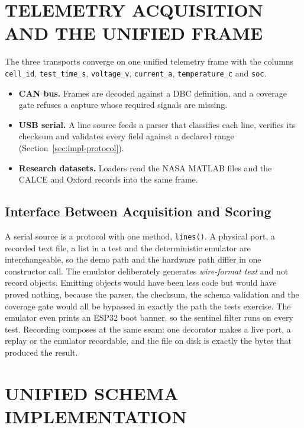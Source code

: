 \documentclass[12pt,a4paper]{amritareport}
\begin{document}
\section{TELEMETRY ACQUISITION AND THE UNIFIED FRAME}
\label{sec:impl-transports}

The three transports converge on one unified telemetry frame with the columns \texttt{cell\_id}, \texttt{test\_time\_s}, \texttt{voltage\_v}, \texttt{current\_a}, \texttt{temperature\_c} and \texttt{soc}.

\begin{itemize}
    \item \textbf{CAN bus.} Frames are decoded against a DBC definition, and a coverage gate refuses a capture whose required signals are missing.
    \item \textbf{USB serial.} A line source feeds a parser that classifies each line, verifies its checksum and validates every field against a declared range (Section~\ref{sec:impl-protocol}).
    \item \textbf{Research datasets.} Loaders read the NASA MATLAB files and the CALCE and Oxford records into the same frame.
\end{itemize}

\subsection{Interface Between Acquisition and Scoring}

A serial source is a protocol with one method, \texttt{lines()}. A physical port, a recorded text file, a list in a test and the deterministic emulator are interchangeable, so the demo path and the hardware path differ in one constructor call. The emulator deliberately generates \emph{wire-format text} and not record objects. Emitting objects would have been less code but would have proved nothing, because the parser, the checksum, the schema validation and the coverage gate would all be bypassed in exactly the path the tests exercise. The emulator even prints an ESP32 boot banner, so the sentinel filter runs on every test. Recording composes at the same seam: one decorator makes a live port, a replay or the emulator recordable, and the file on disk is exactly the bytes that produced the result.

\section{UNIFIED SCHEMA IMPLEMENTATION}
\end{document}
